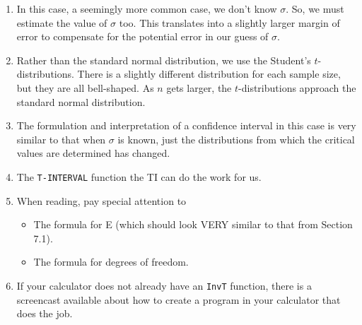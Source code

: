 \documentclass{article}
\begin{document}
\begin{enumerate}

    \item In this case, a seemingly more common case, we don’t know $\sigma$. So, we must estimate the value of $\sigma$ too. This translates into a slightly larger margin of error to compensate for the potential error in our guess of $\sigma$.
    
    \item Rather than the standard normal distribution, we use the Student's $t$-distributions. There is a slightly different distribution for each sample size, but they are all bell-shaped.  As $n$ gets larger, the $t$-distributions approach the standard normal distribution.
    
    \item The formulation and interpretation of a confidence interval in this case is very similar to that when $\sigma$ is known, just the distributions from which the critical values are determined has changed.
    
    \item The \texttt{T-INTERVAL} function the TI can do the work for us.
    
    \item When reading, pay special attention to
    
        \begin{itemize}
        
            \item The formula for E (which should look VERY similar to that from Section 7.1).
            
            \item The formula for degrees of freedom.
            
        \end{itemize}
        
    \item If your calculator does not already have an \texttt{InvT} function, there is a screencast available about how to create a program in your calculator that does the job.
    
\end{enumerate}
\end{document}
